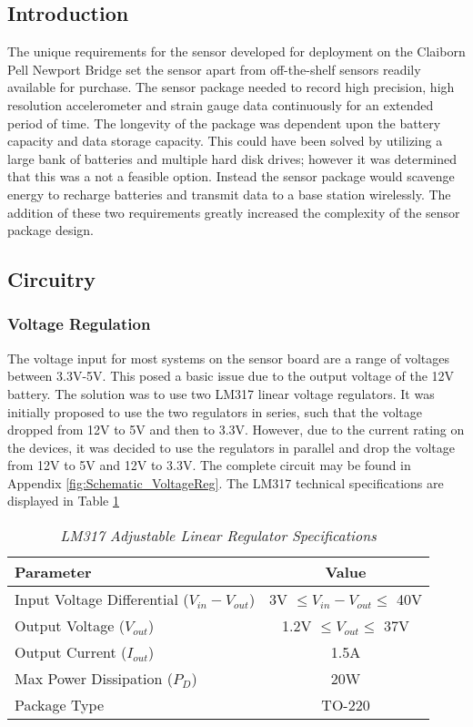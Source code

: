 \subsection{Introduction}
\indent The unique requirements for the sensor developed for deployment on the Claiborn Pell Newport Bridge set the sensor apart from off-the-shelf sensors readily available for purchase.
The sensor package needed to record high precision, high resolution accelerometer and strain gauge data continuously for an extended period of time. 
The longevity of the package was dependent upon the battery capacity and data storage capacity. 
This could have been solved by utilizing a large bank of batteries and multiple hard disk drives; however it was determined that this was a not a feasible option. 
Instead the sensor package would scavenge energy to recharge batteries and transmit data to a base station wirelessly. 
The addition of these two requirements greatly increased the complexity of the sensor package design. \\

\indent 

\subsection{Circuitry}

\subsubsection{Voltage Regulation}
The voltage input for most systems on the sensor board are a range of voltages between 3.3V-5V.
This posed a basic issue due to the output voltage of the 12V battery. 
The solution was to use two LM317 linear voltage regulators.
It was initially proposed to use the two regulators in series, such that the voltage dropped from 12V to 5V and then to 3.3V.
However, due to the current rating on the devices, it was decided to use the regulators in parallel and drop the voltage from 12V to 5V and 12V to 3.3V.
The complete circuit may be found in Appendix \ref{fig:Schematic_VoltageReg}.
The LM317 technical specifications are displayed in Table \ref{tab:LM317} 

\begin{table}[h]
\centering
\begin{tabular}{|l|c|}
\hline
\textbf{Parameter} & \textbf{Value}\\
\hline
Input Voltage Differential ($V_{in}-V_{out}$)& 3V $\le V_{in}-V_{out} \le$ 40V\\
Output Voltage ($V_{out}$) & 1.2V $\le V_{out} \le$ 37V\\
Output Current ($I_{out}$) & 1.5A\\
Max Power Dissipation ($P_{D}$) & 20W\\
Package Type				   & TO-220\\
\hline
\end{tabular}
\caption{\textit{LM317 Adjustable Linear Regulator Specifications}}
\label{tab:LM317}
\end{table}

